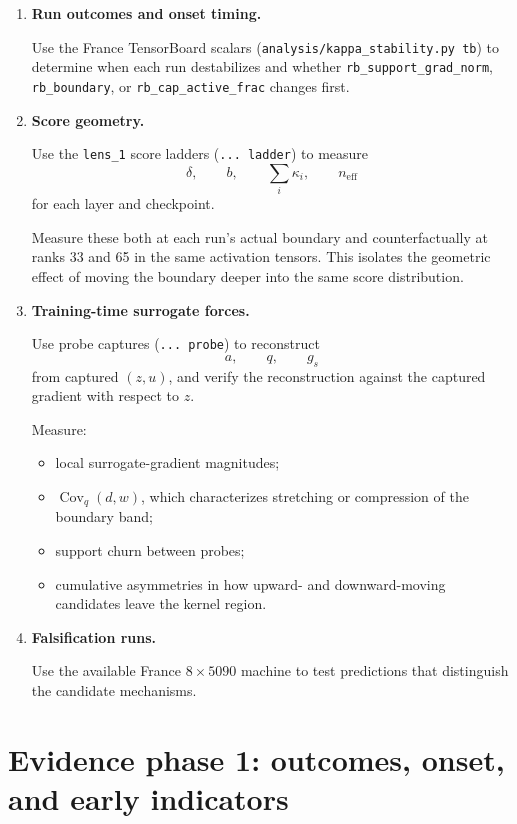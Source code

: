 \documentclass[11pt,a4paper]{article}
\newcommand{\code}[1]{\texttt{#1}}
\newcommand{\neff}{n_{\mathrm{eff}}}
\begin{document}
\begin{enumerate}[leftmargin=1.6em]

\item \textbf{Run outcomes and onset timing.}

Use the France TensorBoard scalars
(\code{analysis/kappa\_stability.py tb}) to determine when each run
destabilizes and whether
\code{rb\_support\_grad\_norm},
\code{rb\_boundary}, or
\code{rb\_cap\_active\_frac}
changes first.

\item \textbf{Score geometry.}

Use the \code{lens\_1} score ladders
(\code{... ladder}) to measure
\[
\delta,\qquad
b,\qquad
\sum_i\kappa_i,\qquad
\neff
\]
for each layer and checkpoint.

Measure these both at each run's actual boundary and counterfactually at ranks
33 and 65 in the same activation tensors. This isolates the geometric effect
of moving the boundary deeper into the same score distribution.

\item \textbf{Training-time surrogate forces.}

Use probe captures
(\code{... probe}) to reconstruct
\[
a,\qquad q,\qquad g_s
\]
from captured \((z,u)\), and verify the reconstruction against the captured
gradient with respect to \(z\).

Measure:
\begin{itemize}[leftmargin=1.4em]
    \item local surrogate-gradient magnitudes;
    \item \(\operatorname{Cov}_q(d,w)\), which characterizes stretching or
    compression of the boundary band;
    \item support churn between probes;
    \item cumulative asymmetries in how upward- and downward-moving candidates
    leave the kernel region.
\end{itemize}

\item \textbf{Falsification runs.}

Use the available France \(8\times5090\) machine to test predictions that
distinguish the candidate mechanisms.

\end{enumerate}


\section{Evidence phase 1: outcomes, onset, and early indicators}
\end{document}
